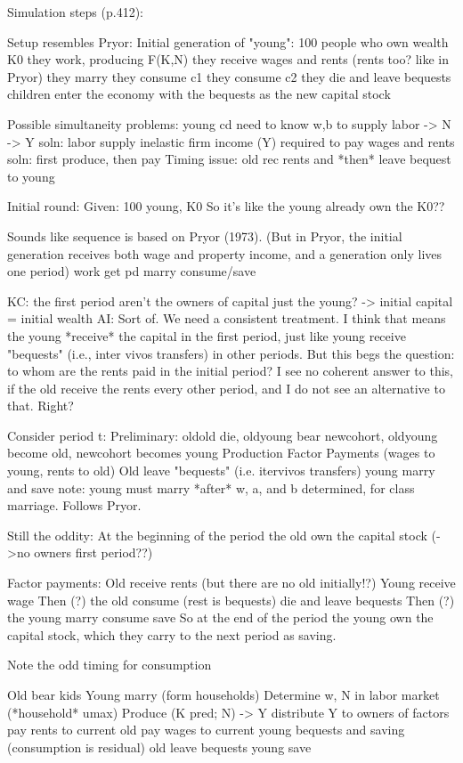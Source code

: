 \documentclass{article}
\begin{document}
Simulation steps (p.412):
\begin{verbatimtab}
Setup resembles Pryor:
Initial generation of "young":
        100 people who own wealth K0
they work, producing F(K,N)
they receive wages and rents (rents too? like in Pryor)
they marry
they consume c1
they consume c2
they die and leave bequests
children enter the economy with the bequests as the new capital stock
\end{verbatimtab}
\begin{verbatimtab}
Possible simultaneity problems:
        young cd need to know w,b to supply labor -> N -> Y
                soln: labor supply inelastic
        firm income (Y) required to pay wages and rents
                soln: first produce, then pay
Timing issue:
        old rec rents and *then* leave bequest to young

Initial round:
        Given: 100 young, K0
        So it's like the young already own the K0??

Sounds like sequence is based on Pryor (1973).
(But in Pryor, the initial generation receives both wage and property income,
and a generation only lives one period)
        work
        get pd
        marry
        consume/save

KC: the first period aren't the owners of capital just the young? -> initial capital = initial wealth
AI: Sort of.  We need a consistent treatment.  I think that means the young *receive* the capital
    in the first period, just like young receive "bequests" (i.e., inter vivos transfers) in other
    periods.  But this begs the question: to whom are the rents paid in the initial period?
    I see no coherent answer to this, if the old receive the rents every other period,
    and I do not see an alternative to that.  Right?

Consider period t:
Preliminary: oldold die, oldyoung bear newcohort, oldyoung become old, newcohort becomes young
Production
Factor Payments (wages to young, rents to old)
Old leave "bequests" (i.e. itervivos transfers)
young marry and save
        note: young must marry *after* w, a, and b determined, for class marriage.  Follows Pryor.

Still the oddity:
At the beginning of the period the old own the capital stock (->no owners first period??)

Factor payments:
        Old receive rents (but there are no old initially!?)
        Young receive wage
Then (?) the old
        consume (rest is bequests)
        die and leave bequests
Then (?) the young
        marry
        consume
        save
So at the end of the period the young own the capital stock,
which they carry to the next period as saving.

Note the odd timing for consumption

Old bear kids
Young marry (form households)
Determine w, N in labor market (*household* umax)
Produce (K pred; N) -> Y
        distribute Y to owners of factors
                pay rents to current old
                pay wages to current young
        bequests and saving (consumption is residual)
                old leave bequests
                young save
\end{verbatimtab}
\end{document}
